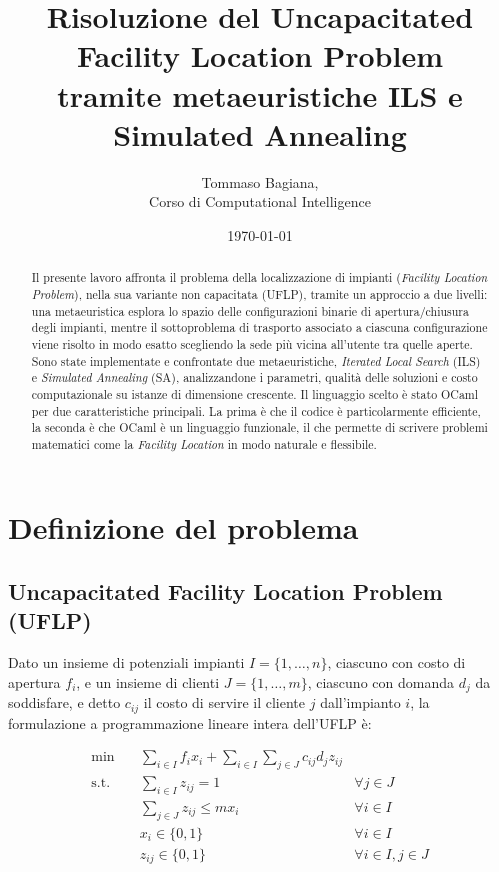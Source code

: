 \documentclass[11pt,a4paper]{article}
\title{Risoluzione del Uncapacitated Facility Location Problem \\
       tramite metaeuristiche ILS e Simulated Annealing}
\author{Tommaso Bagiana, \\
        Corso di Computational Intelligence \\
       }
\date{\today}
\begin{document}
\maketitle

\begin{abstract}
Il presente lavoro affronta il problema della localizzazione di impianti (\emph{Facility
Location Problem}), nella sua variante non capacitata (UFLP), tramite
un approccio a due livelli: una metaeuristica esplora lo spazio delle configurazioni
binarie di apertura/chiusura degli impianti, mentre il sottoproblema di trasporto
associato a ciascuna configurazione viene risolto in modo esatto scegliendo la sede più vicina all'utente tra quelle aperte. Sono state
implementate e confrontate due metaeuristiche, \emph{Iterated Local Search} (ILS) e
\emph{Simulated Annealing} (SA), analizzandone i parametri, qualità delle
soluzioni e costo computazionale su istanze di dimensione crescente.
Il linguaggio scelto è stato OCaml per due caratteristiche principali. La prima è che il codice è particolarmente efficiente, la seconda è che OCaml è un linguaggio funzionale, il che permette di scrivere problemi matematici come la \emph{Facility Location} in modo naturale e flessibile.
\end{abstract}

\tableofcontents
\newpage

\section{Definizione del problema}

\subsection{Uncapacitated Facility Location Problem (UFLP)}

Dato un insieme di potenziali impianti $I = \{1, \dots, n\}$, ciascuno con costo di
apertura $f_i$, e un insieme di clienti $J = \{1, \dots, m\}$, ciascuno con domanda $d_j$ da
soddisfare, e detto $c_{ij}$ il costo di servire il cliente $j$ dall'impianto $i$, la
formulazione a programmazione lineare intera dell'UFLP è:

\begin{align}
    \min \quad & \sum_{i \in I} f_i x_i + \sum_{i \in I} \sum_{j \in J} c_{ij} d_j z_{ij} \\
    \text{s.t.} \quad & \sum_{i \in I} z_{ij} = 1 & \forall j \in J \label{eq:uflp-demand}\\
    & \sum_{j \in J} z_{ij} \le m x_i & \forall i \in I \label{eq:uflp-open}\\
    & x_i \in \{0,1\} & \forall i \in I \\
    & z_{ij} \in \{0,1\} & \forall i \in I, j \in J
\end{align}
\end{document}
